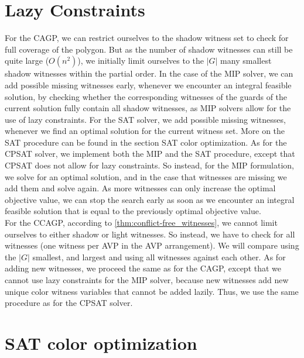 \section{Lazy Constraints}
For the CAGP, we can restrict ourselves to the shadow witness set to check for full coverage of the polygon. But as the number of shadow witnesses can still be quite large ($O(n^2)$), we initially limit ourselves to the $|G|$ many smallest shadow witnesses within the partial order. In the case of the MIP solver, we can add possible missing witnesses early, whenever we encounter an integral feasible solution, by checking whether the corresponding witnesses of the guards of the current solution fully contain all shadow witnesses, as MIP solvers allow for the use of lazy constraints. For the SAT solver, we add possible missing witnesses, whenever we find an optimal solution for the current witness set. More on the SAT procedure can be found in the section SAT color optimization. As for the CPSAT solver, we implement both the MIP and the SAT procedure, except that CPSAT does not allow for lazy constraints. So instead, for the MIP formulation, we solve for an optimal solution, and in the case that witnesses are missing we add them and solve again. As more witnesses can only increase the optimal objective value, we can stop the search early as soon as we encounter an integral feasible solution that is equal to the previously optimal objective value.\\
For the CCAGP, according to \cref{thm:conflict-free_witnesses}, we cannot limit ourselves to either shadow or light witnesses. So instead, we have to check for all witnesses (one witness per AVP in the AVP arrangement). We will compare using the $|G|$ smallest, and largest and using all witnesses against each other. As for adding new witnesses, we proceed the same as for the CAGP, except that we cannot use lazy constraints for the MIP solver, because new witnesses add new unique color witness variables that cannot be added lazily. Thus, we use the same procedure as for the CPSAT solver.

\section{SAT color optimization}